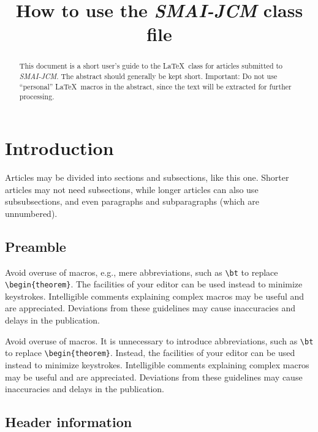 \documentclass[a4paper]
{cedram-smai-jcm}
\title[\LaTeX\ sample SMAI-JCM]{How to use the \emph{SMAI-JCM} class file}
\author[C. Untel]{\firstname{Thierry} \lastname{Untel}}
\author[J. Doe]{\firstname{Jane} \middlename{Q.} \lastname{Doe}}
\begin{document}
\begin{abstract}
This document is a short user's guide to the \LaTeX\ 
class for articles submitted to \emph{SMAI-JCM}.
The abstract should generally be kept short.
Important: Do not use ``personal'' \LaTeX\ macros in the abstract,
since the text will be extracted for further processing.
\end{abstract}

\maketitle



\section{Introduction}

Articles may be divided into sections and subsections, like this one.
Shorter articles may not need subsections, while longer articles
can also use subsubsections, and even paragraphs and subparagraphs
(which are unnumbered).

\subsection{Preamble}
Avoid overuse of macros, e.g., mere abbreviations, such as \verb#\bt# to replace
\verb#\begin{theorem}#. The facilities of your editor can be used instead
to minimize keystrokes. Intelligible comments explaining complex
macros may be useful and are appreciated.  Deviations from these
guidelines may cause inaccuracies and delays in the publication.

Avoid overuse of macros.  It is unnecessary to introduce abbreviations,
such as \verb#\bt# to replace \verb#\begin{theorem}#. Instead, the 
facilities of your editor can be used instead
to minimize keystrokes. Intelligible comments explaining complex
macros may be useful and are appreciated.  Deviations from these
guidelines may cause inaccuracies and delays in the publication.

\subsection{Header information}
\end{document}
